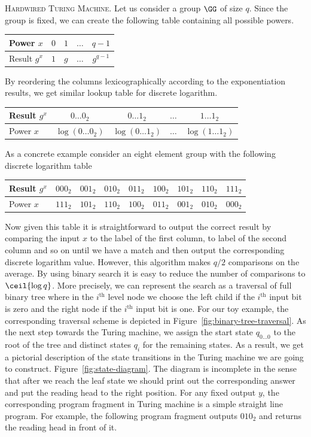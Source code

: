 \documentclass{crypto-exercise}
\begin{document}
\begin{solution}
\textsc{Hardwired Turing Machine.}
Let us consider a group $\GG$ of size $q$. Since the group is fixed, we can create the following table containing all possible powers.
\begin{center} 
\begin{tabular}{|l|c|c|c|c|}
\hline
Power $x$ & $0$ & $1$ & $\ldots$ & $q-1$\\
\hline
Result $g^x$ & $1$ & $g$ & $\ldots$ & $g^{q-1}$\\
\hline
\end{tabular}
\end{center}
By reordering the columns lexicographically according to the exponentiation results, we get similar lookup table for discrete logarithm. 
\begin{center} 
\begin{tabular}{|l|c|c|c|c|}
\hline
Result $g^x$ & $0\ldots0_2$ & $0\ldots1_2$ & $\ldots$ & $1\ldots1_2$\\
\hline
Power $x$ & $\log(0\ldots0_2)$ & $\log(0\ldots1_2)$ & $\ldots$ & $\log(1\ldots1_2)$\\
\hline
\end{tabular}
\end{center}
As a concrete example consider an eight element group with the following discrete logarithm table
\begin{center} 
\begin{tabular}{|l|c|c|c|c|c|c|c|c|}
\hline
Result $g^x$ & $000_2$ & $001_2$ & $010_2$ & $011_2$ & $100_2$ & $101_2$ & $110_2$ & $111_2$\\
\hline
Power $x$ &  $111_2$ & $101_2$ & $110_2$ & $100_2$ & $011_2$ & $001_2$ & $010_2$ & $000_2$\\
\hline
\end{tabular}
\end{center}
Now given this table it is straightforward to output the correct result by comparing the input $x$ to the label of the first column, to label of the second column and so on until we have a match and then output the corresponding discrete logarithm value. However, this algorithm makes $q/2$ comparisons on the average. By using binary search it is easy to reduce the number of comparisons to $\ceil{\log q}$. More precisely, we can represent the search as a traversal of full binary tree where in the $i^{\text{th}}$ level node we choose the left child if the $i^{\text{th}}$ input bit is zero and the right node if the $i^{\text{th}}$ input bit is one. For our toy example, the corresponding traversal scheme is depicted in Figure~\ref{fig:binary-tree-traversal}. As the next step towards the Turing machine, we assign the start state $q_{0\ldots0}$ to the root of the tree and distinct states $q_i$ for the remaining states. As a result, we get a pictorial description of the state transitions in the Turing machine we are going to construct. Figure~\ref{fig:state-diagram}. The diagram is incomplete in the sense that after we reach the leaf state we should print out the corresponding answer and put the reading head to the right position. For any fixed output $y$, the corresponding program fragment in Turing machine is a simple straight line program. For example, the following program fragment outputs $010_2$ and returns the reading head in front of it.

\end{solution}
\end{document}
